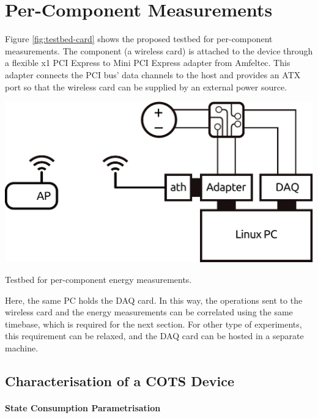 \documentclass[twoside,nohyper]{tufte-book}
\theoremstyle{definition}
\theoremstyle{definition}
\theoremstyle{definition}
\theoremstyle{remark}
\begin{document}
\section{Per-Component Measurements}\label{per-component-measurements}

Figure \ref{fig:testbed-card} shows the proposed testbed for
per-component measurements. The component (a wireless card) is attached
to the device through a flexible x1 PCI Express to Mini PCI Express
adapter from Amfeltec. This adapter connects the PCI bus' data channels
to the host and provides an ATX port so that the wireless card can be
supplied by an external power source.



\begin{marginfigure}

{\centering \includegraphics[width=1\linewidth]{img/03/testbed-card} 

}

\caption[Testbed for per-component energy measurements.]{Testbed for per-component energy measurements.}\label{fig:testbed-card}
\end{marginfigure}

Here, the same PC holds the DAQ card. In this way, the operations sent
to the wireless card and the energy measurements can be correlated using
the same timebase, which is required for the next section. For other
type of experiments, this requirement can be relaxed, and the DAQ card
can be hosted in a separate machine.

\subsection{Characterisation of a COTS
Device}\label{characterisation-of-a-cots-device}

\paragraph{State Consumption
Parametrisation}\label{state-consumption-parametrisation}
\end{document}
